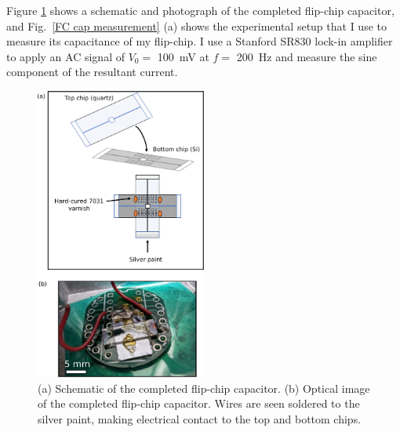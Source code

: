 \documentclass[double,12pt,1in,seploa]{beavtex}
\begin{document}
Figure \ref{flipping chips} shows a schematic and photograph of the completed flip-chip capacitor, and Fig.\ \ref{FC cap measurement} (a) shows the experimental setup that I use to measure its capacitance of my flip-chip. I use a Stanford SR830 lock-in amplifier to apply an AC signal of $V_0 = $ \SI{100}{\milli\volt} at $f = $ \SI{200}{\hertz} and measure the sine component of the resultant current. 

\begin{figure}
    \includegraphics[width=0.5\textwidth]{flipping chips.pdf}
    \caption{(a) Schematic of the completed flip-chip capacitor. (b) Optical image of the completed flip-chip capacitor. Wires are seen soldered to the silver paint, making electrical contact to the top and bottom chips.}
    \label{flipping chips}
\end{figure}
\end{document}
